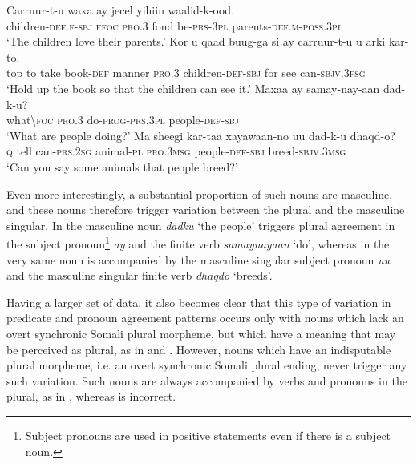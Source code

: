 \documentclass[output=paper]{langsci/langscibook}
\begin{document}
\ea
\ea
\gll Carruur-t-u          waxa ay      jecel  yihiin           waalid-k-ood.\\
       children-\textsc{def.f-sbj} \textsc{ffoc} \textsc{pro.3} fond  be\textsc{-prs-3pl} parents-\textsc{def.m}-\textsc{poss.3pl}\\
\glt ‘The children love their parents.’
\ex
\gll Kor u qaad buug-ga  si          ay      carruur-t-u          u   arki kar-to.\\
     top to take book-\textsc{def} manner \textsc{pro.3} children-\textsc{def-sbj} for see can-\textsc{sbjv.3fsg}\\
\glt ‘Hold up the book so that the children can see it.’
\ex
\gll Maxaa     ay          samay-nay-aan     dad-k-u?\\
       what{\textbackslash}\textsc{foc pro.3}  do-\textsc{prog-prs.3pl}  people\textsc{-def-sbj}\\
\glt ‘What are people doing?’
\ex
\gll Ma sheegi kar-taa         xayawaan-no  uu        dad-k-u             dhaqd-o?\\
       \textsc{q}     tell     can-\textsc{prs.2sg} animal\textsc{-pl}  \textsc{pro.3msg}  people\textsc{-def-sbj} breed-\textsc{sbjv.3msg}\\
\glt ‘Can you say some animals that people breed?’
\z
\z

Even more interestingly, a substantial proportion of such nouns are masculine, and these nouns therefore trigger variation between the plural and the masculine singular. In  the masculine noun \textit{dadku} ‘the people’ triggers plural agreement in the subject pronoun\footnote{Subject pronouns are used in positive statements even if there is a subject noun.} \textit{ay} and the finite verb \textit{samaynayaan} ‘do’, whereas in  the very same noun is accompanied by the masculine singular subject pronoun \textit{uu} and the masculine singular finite verb \textit{dhaqdo} ‘breeds’. 

Having a larger set of data, it also becomes clear that this type of variation in predicate and pronoun agreement patterns occurs only with nouns which lack an overt synchronic Somali plural morpheme, but which have a meaning that may be perceived as plural, as in  and . However, nouns which have an indisputable plural morpheme, i.e. an overt synchronic Somali plural ending, never trigger any such variation. Such nouns are always accompanied by verbs and pronouns in the plural, as in , whereas  is incorrect.
\end{document}
